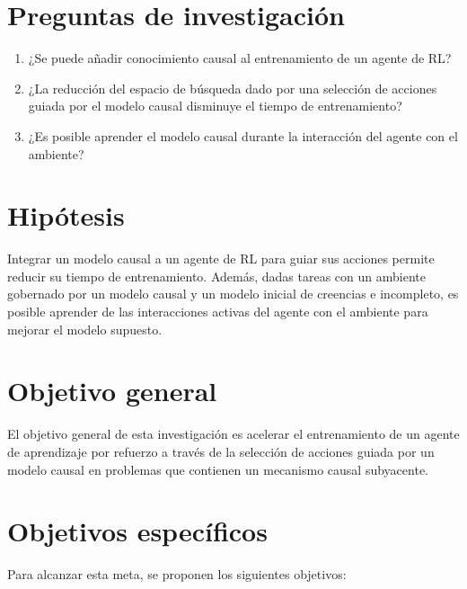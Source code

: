 
\section{Preguntas de investigación}

\begin{enumerate}
    \item ¿Se puede añadir conocimiento causal al entrenamiento de un agente de RL?
    \item ¿La reducción del espacio de búsqueda dado por una selección
    de acciones guiada por el modelo causal disminuye el tiempo de 
    entrenamiento?
    \item ¿Es posible aprender el modelo causal durante la interacción del
    agente con el ambiente?
\end{enumerate}
\section{Hipótesis}
Integrar un modelo causal a un agente de RL para guiar sus
    acciones permite reducir su tiempo de entrenamiento. Además, dadas
    tareas con un ambiente gobernado por un modelo
    causal y un modelo inicial de creencias e incompleto, es posible  aprender de las interacciones activas del agente con el ambiente
    para mejorar el modelo supuesto.
    
\section{Objetivo general}
El objetivo general de esta investigación
es acelerar el entrenamiento de un agente de aprendizaje por refuerzo a través de la selección de acciones guiada por un 
modelo causal en problemas que contienen
un mecanismo causal subyacente.

\section{Objetivos específicos}

Para alcanzar esta meta, se proponen
los siguientes objetivos:


